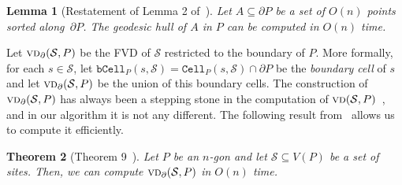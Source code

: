 \documentclass[a4paper, 11pt]{article}
\newtheorem{theorem}{Theorem}[section]
\newtheorem{corollary}[theorem]{Corollary}
\newtheorem{lemma}[theorem]{Lemma}
\newcommand{\s}{\mathcal S}
\newcommand{\p}[3][P]{\ensuremath{\pi_{_{#1}}(#2, #3)}}
\newcommand{\cell}[2][P]{\ensuremath{\mathtt{Cell}_{\scriptscriptstyle #1}(#2)}}
\newcommand{\bcell}[2][P]{\ensuremath{\mathtt{bCell}_{\scriptscriptstyle #1}(#2)}}
\newcommand{\vd}[2][P]{\textsc{vd}(#2, #1)}
\newcommand{\bvd}[2][P]{\textsc{vd}_{\partial}(#2, #1)}
\begin{document}
\begin{lemma}[Restatement of Lemma 2 of~\cite{kpairpath}]\label{lemma:Geodesic hull computation}
Let $A\subseteq \partial P$ be a set of $O(n)$ points sorted along~$\partial P$. 
The geodesic hull of $A$ in $P$ can be computed in $O(n)$ time.
\end{lemma}

%


Let $\bvd{\s}$ be the FVD of $\s$ restricted to the boundary of $P$. 
More formally, for each $s\in \s$, let $\bcell{s, \s} = \cell{s, \s}\cap \partial P$ be the \emph{boundary cell} of $s$ and let $\bvd{\s}$ be the union of this boundary cells. The construction of $\bvd{\s}$ has always been a stepping stone in the computation of $\vd{\s}$~\cite{aronov1993furthest,oh2016farthest}, and in our algorithm it is not any different. 
The following result from~\cite{oh2016farthest} allows us to compute it efficiently.

\begin{theorem}[Theorem 9~\cite{oh2016farthest}]\label{thm:VD in boundary}
Let $P$ be an $n$-gon and let $\s\subseteq V(P)$ be a set of sites. 
Then, we can compute $\bvd{\s}$ in $O(n)$ time. 
\end{theorem}
\end{document}
